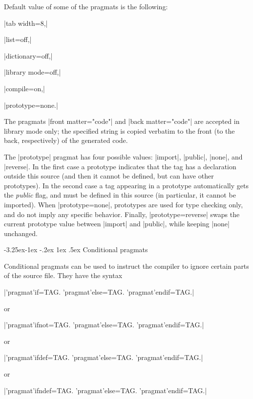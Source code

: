\documentclass{article}
\makeatletter
\newcommand\g[1]{\textsf{#1}}
\renewcommand\subsection{%
\@startsection{subsection}{2}{\z@}%
   {-3.25ex\@plus -1ex \@minus -.2ex}%
   {1ex \@plus .5ex}%
   {\normalfont\normalsize\bfseries}}
\makeatother
\begin{document}
Default value of some of the pragmats is the following:

\HH\pp|tab width=8,|\HE

\HH\pp|list=off,|\HE

\HH\pp|dictionary=off,|\HE

\HH\pp|library mode=off,|\HE

\HH\pp|compile=on,|\HE

\HH\pp|prototype=none.|\HE

\smallskip
The pragmats \pp|front matter="code"|  and \pp|back matter="code"| are
accepted in library mode only; the specified string is copied verbatim to
the front (to the back, respectively) of the generated code.

The \pp|prototype| pragmat has four possible values: \pp|import|,
\pp|public|, \pp|none|, and \pp|reverse|. In the first case a \g{prototype}
indicates that the tag has a declaration outside this source (and then it
cannot be defined, but can have other prototypes). In the second case a tag
appearing in a \g{prototype} automatically gets the \emph{public} flag, and
must be defined in this source (in particular, it cannot be imported). When
\pp|prototype=none|, prototypes are used for type checking only, and do
not imply any specific behavior. Finally, \pp|prototype=reverse| swaps the
current prototype value between \pp|import| and \pp|public|, while keeping
\pp|none| unchanged.

\subsection{Conditional pragmats}\label{conditional}

Conditional pragmats can be used to instruct the compiler to ignore certain
parts of the source file. They have the syntax

\medskip

\pp|'pragmat'if=TAG.     'pragmat'else=TAG.   'pragmat'endif=TAG.|

\noindent or

\pp|'pragmat'ifnot=TAG.  'pragmat'else=TAG.   'pragmat'endif=TAG.|

\noindent or

\pp|'pragmat'ifdef=TAG.  'pragmat'else=TAG.   'pragmat'endif=TAG.|

\noindent or

\pp|'pragmat'ifndef=TAG. 'pragmat'else=TAG.   'pragmat'endif=TAG.|
\end{document}
